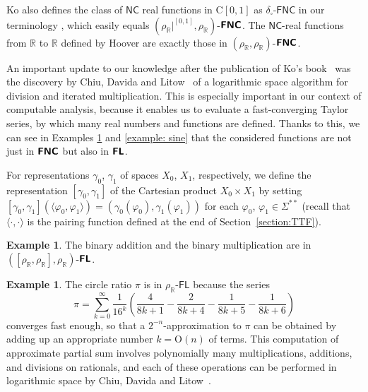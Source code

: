 \documentclass[conference]{IEEEtran}
\newcommand{\R}{\mathbb R}
\newcommand{\classonefont}[1]{\mathsf{#1}}
\newcommand{\classFL}{\classonefont{FL}}
\newcommand{\classNC}{\classonefont{NC}}
\newcommand{\classFNC}{\classonefont{FNC}}
\newcommand{\classtwofont}[1]{\text{\bfseries \sffamily \upshape #1}}
\newcommand{\classFLtwo}{\classtwofont{FL}}
\newcommand{\classFNCtwo}{\classtwofont{FNC}}
\newcommand{\deltabox}{\delta _\square}
\newcommand{\rhoR}{\rho _\R}
\newcommand{\rhoRunit}{\rho _\R|^{[0,1]}}
\newcommand{\classC}{\mathrm C}
\newcommand{\LM}{\varSigma ^{**}}
\theoremstyle{definition}
\newtheorem{example}[theorem]{Example}
\theoremstyle{remark}
\begin{document}
Ko also defines the class of $\classNC$ real functions in $\classC[0,1]$
as $\deltabox$-$\classFNC$ in our terminology 
\cite{ko1991complexity},
which easily equals $(\rhoRunit, \rhoR)$-$\classFNCtwo$.
The $\classNC$-real functions from $\R$ to $\R$ defined by Hoover \cite{hoover1991real}
are exactly those in $(\rhoR, \rhoR)$-$\classFNCtwo$.

An important update to our knowledge
after the publication of Ko's book~\cite{ko1991complexity} was the 
discovery by Chiu, Davida and Litow~\cite{chiu2001division}
of a logarithmic space algorithm 
for division and iterated multiplication. 
This is especially important in our context of computable analysis, 
because it enables us to evaluate a fast-converging Taylor series, 
by which many real numbers and functions are defined. 
Thanks to this, we can see 
in Examples \ref{example: pi} and \ref{example: sine}
that the considered functions are not just in $\classFNCtwo$ but also in $\classFLtwo$. 

For representations $\gamma _0$, $\gamma _1$ of 
spaces $X _0$, $X _1$, respectively, 
we define the representation $[\gamma _0, \gamma _1]$
of the Cartesian product $X _0 \times X _1$ by 
setting $
  [\gamma _0, \gamma _1] (\langle \varphi _0, \varphi _1 \rangle) 
= 
  (\gamma _0 (\varphi _0), \gamma _1 (\varphi _1))
$ for each $\varphi _0$, $\varphi _1 \in \LM$
(recall that $\langle \mathord\cdot, \mathord\cdot \rangle$
is the pairing function defined at the end of Section~\ref{section:TTF}). 

\begin{example}
 The binary addition and the binary multiplication are
 in $([\rhoR, \rhoR], \rhoR)$-$\classFLtwo$.
\end{example}

\begin{example}
\label{example: pi}
The circle ratio $\pi$ is in $\rhoR$-$\classFL$ because the series
\begin{equation}
 \pi = \sum_{k=0}^\infty \frac{1}{16^k} 
  \left( \frac{4}{8k+1} - \frac{2}{8k+4} - \frac{1}{8k+5} - \frac{1}{8k+6} \right)
\end{equation}
converges fast enough, 
so that a $2 ^{-n}$-approximation to $\pi$ can be obtained by adding up 
an appropriate number $k = \mathrm O (n)$ of terms. 
This computation of approximate partial sum involves 
polynomially many multiplications, additions, and divisions on rationals, 
and each of these operations can be performed in logarithmic space
by Chiu, Davida and Litow~\cite{chiu2001division}.
\end{example}
\end{document}
